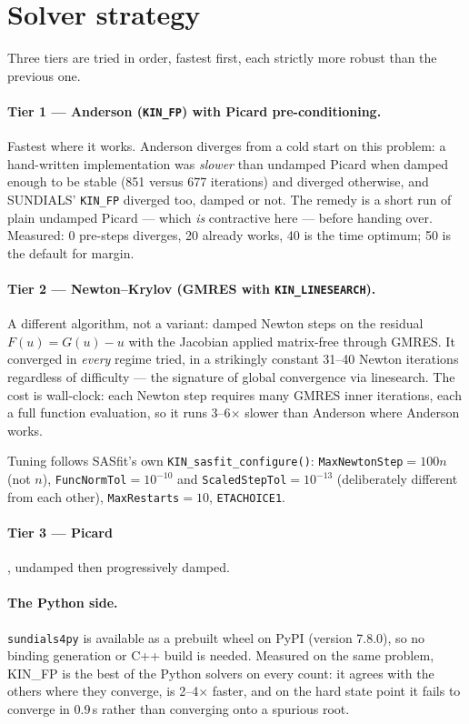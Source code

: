\documentclass[11pt,a4paper]{article}
\newcommand{\code}[1]{\texttt{\hspace{0pt}#1}}
\begin{document}
\section{Solver strategy}
\label{sec:solvers}

Three tiers are tried in order, fastest first, each strictly more robust than
the previous one.

\paragraph{Tier 1 --- Anderson (\code{KIN\_FP}) with Picard
pre-conditioning.} Fastest where it works. Anderson diverges from a cold
start on this problem: a hand-written implementation was \emph{slower} than
undamped Picard when damped enough to be stable (851 versus 677 iterations)
and diverged otherwise, and SUNDIALS' \code{KIN\_FP} diverged too, damped or
not. The remedy is a short run of plain undamped Picard --- which \emph{is}
contractive here --- before handing over. Measured: 0 pre-steps diverges, 20
already works, 40 is the time optimum; 50 is the default for margin.

\paragraph{Tier 2 --- Newton--Krylov (GMRES with \code{KIN\_LINESEARCH}).}
A different algorithm, not a variant: damped Newton steps on the residual
$F(u)=G(u)-u$ with the Jacobian applied matrix-free through GMRES. It
converged in \emph{every} regime tried, in a strikingly constant 31--40
Newton iterations regardless of difficulty --- the signature of global
convergence via linesearch. The cost is wall-clock: each Newton step requires
many GMRES inner iterations, each a full function evaluation, so it runs
3--6$\times$ slower than Anderson where Anderson works.

Tuning follows SASfit's own \code{KIN\_sasfit\_configure()}:
\code{MaxNewtonStep}$=100n$ (not $n$), \code{FuncNormTol}$=10^{-10}$ and
\code{ScaledStepTol}$=10^{-13}$ (deliberately different from each other),
\code{MaxRestarts}$=10$, \code{ETACHOICE1}.

\paragraph{Tier 3 --- Picard}, undamped then progressively damped.

\paragraph{The Python side.} \code{sundials4py} is available as a prebuilt
wheel on PyPI (version 7.8.0), so no binding generation or C++ build is
needed. Measured on the same problem, KIN\_FP is the best of the Python
solvers on every count: it agrees with the others where they converge, is
2--4$\times$ faster, and on the hard state point it fails to converge in
0.9\,s rather than converging onto a spurious root.
\end{document}
